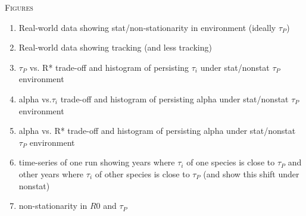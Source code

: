 \documentclass[11pt,letterpaper]{article}
\renewcommand{\section}[1]{%
\bigskip
\begin{center}
\begin{Large}
\normalfont\scshape #1
\medskip
\end{Large}
\end{center}}
\begin{document}
\section{Figures}
\begin{enumerate}
\item Real-world data showing stat/non-stationarity in environment (ideally $\tau_{P}$) 
\item Real-world data showing tracking (and less tracking)
\item $\tau_{P}$ vs. R* trade-off and histogram of persisting $\tau_i$ under stat/nonstat $\tau_{P}$ environment
\item alpha vs.$\tau_i$ trade-off and histogram of persisting alpha under stat/nonstat $\tau_{P}$ environment
\item alpha vs. R* trade-off and histogram of persisting alpha under stat/nonstat $\tau_{P}$ environment
\item time-series of one run showing years where $\tau_i$ of one species is close to $\tau_{P}$ and other years where $\tau_i$ of other species is close to $\tau_{P}$ (and show this shift under nonstat)
\item non-stationarity in $R0$ and $\tau_{P}$
\end{enumerate}








% 
% 


\end{document}
